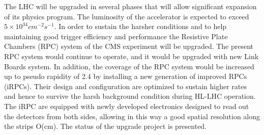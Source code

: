 The LHC will be upgraded in several phases that will allow significant expansion of its physics program. The luminosity of the accelerator is expected to exceed $5 \times 10^{34} cm^{-2}s^{-1}$.  In order to sustain the harsher conditions and to help maintaining good trigger efficiency and performance the Resistive Plate Chambers (RPC) system of the CMS experiment will be upgraded. The present RPC system would continue to operate, and it would be upgraded with new Link Boards system. In addition, the coverage of the RPC system would be increased up to pseudo rapidity of 2.4 by installing a new generation of improved RPCs (iRPCs). Their design and configuration are optimized to sustain higher rates and hence to survive the harsh background condition during HL-LHC operation. The iRPC are equipped with newly developed electronics designed to read out the detectors from both sides, allowing in this way a good spatial resolution along the strips O(cm). The status of the upgrade project is presented.